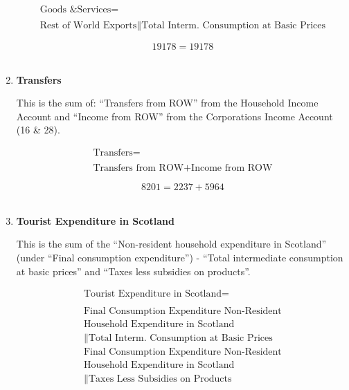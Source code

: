 \begin{enumerate}
\begin{equation}
\begin{split}
\text{Goods \& Services} =  \\ \\
\text{Rest of World Exports}\|\text{Total Interm. Consumption at Basic Prices}
\end{split} \label{eq:2.5.66}
\end{equation}

\begin{equation} \nonumber
19178 = 19178
\end{equation}\\


\item \textbf {Transfers}

This is the sum of: ``Transfers from ROW'' from the Household Income Account and ``Income from ROW'' from the Corporations Income Account (16 \& 28).

\begin{equation}
\begin{split}
\text{Transfers} =  \\ \\
\text{Transfers from ROW}+\text{Income from ROW}
\end{split} \label{eq:2.5.67}
\end{equation}

\begin{equation} \nonumber
8201 = 2237+5964
\end{equation}\\



\item \textbf {Tourist Expenditure in Scotland}

This is the sum of the ``Non-resident household expenditure in Scotland'' (under ``Final consumption expenditure'') - ``Total intermediate consumption at basic prices'' and ``Taxes less subsidies on products''. \cite{ScotGov2013a}

\begin{equation}
\begin{split}
\text{Tourist Expenditure in Scotland} =  \\ \\
\text{Final Consumption Expenditure Non-Resident}\\
\text{Household Expenditure in Scotland}\\
\|\text{Total Interm. Consumption at Basic Prices}\\
\text{Final Consumption Expenditure Non-Resident}\\
\text{Household Expenditure in Scotland}\\
\|\text{Taxes Less Subsidies on Products}
\end{split} \label{eq:2.5.68}
\end{equation}


\end{enumerate}
